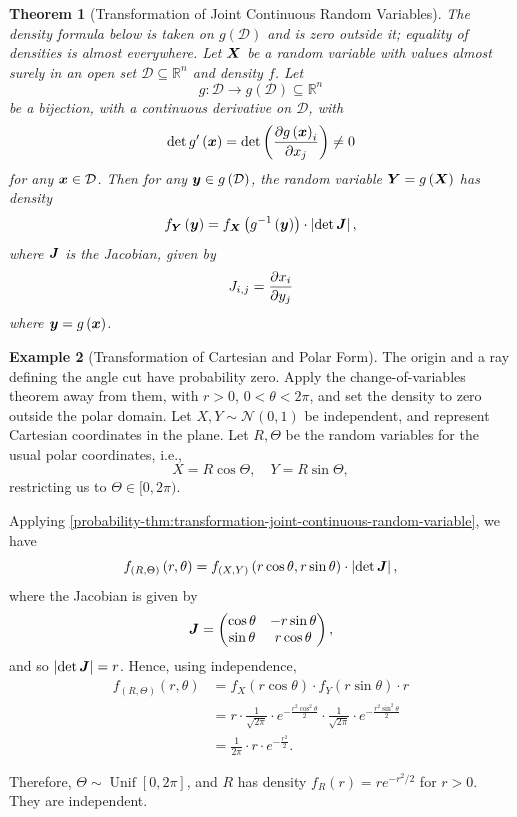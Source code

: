 \documentclass[11pt]{article}
\numberwithin{equation}{section}
\newtheorem{theorem}{Theorem}[section]
\theoremstyle{definition}
\newtheorem{example}[theorem]{Example}
\theoremstyle{remark}
\newcommand{\pqty}[1]{\left(#1\right)}
\newcommand{\abs}[1]{\left|#1\right|}
\newcommand{\ccintv}[2]{[#1,#2]}
\newcommand{\cointv}[2]{[#1,#2)}
\newcommand{\functiondomain}[3]{#1:#2\to #3}
\newcommand{\RR}{\mathbb R}
\newcommand{\inverse}{^{-1}}
\newcommand{\Uniform}{\operatorname{Unif}}
\newcommand{\Normal}{\mathcal N}
\newcommand{\pmqty}[1]{\begin{pmatrix}#1\end{pmatrix}}
\begin{document}
\begin{theorem}[Transformation of Joint Continuous Random Variables]\label{probability-theorem-021}
    \label{probability-thm:transformation-joint-continuous-random-variable}
The density formula below is taken on \(g(\mathcal D)\) and is zero outside it; equality of densities is almost everywhere.
%
    Let \(\vb{X}\) be a random variable with values almost surely in an open set \(\mathcal{D} \subseteq \RR^n\) and density \(f\). Let
    \[
        \functiondomain{g}{\mathcal{D}}{g\pqty{\mathcal{D}} \subseteq \RR^n}
    \]
    be a bijection, with a continuous derivative on \(\mathcal{D}\), with
    \[
        \det g'\pqty{\vb{x}} = \det \pqty{\pdv{g\pqty{\vb{x}}_i}{x_j}} \neq 0
    \]
    for any \(\vb{x} \in \mathcal{D}\). Then for any \(\vb{y} \in g\pqty{\mathcal{D}}\), the random variable \(\vb{Y} = g\pqty{\vb{X}}\) has density
    \[
        f_{\vb{Y}}\pqty{\vb{y}} = f_{\vb{X}} \pqty{g\inverse\pqty{\vb{y}}} \cdot \abs{\det \vb{J}},
    \]
    where \(\vb{J}\) is the \emph{Jacobian}, given by
    \[
        J_{i, j} = \pdv{x_i}{y_j}
    \]
    where \(\vb{y} = g\pqty{\vb{x}}\).
\end{theorem}

\begin{example}[Transformation of Cartesian and Polar Form]\label{probability-example-037}
    \label{probability-ex:transformation-cartesian-polar}%
The origin and a ray defining the angle cut have probability zero. Apply the change-of-variables theorem away from them, with \(r>0\), \(0<\theta<2\pi\), and set the density to zero outside the polar domain.
    Let \(X, Y \sim \Normal\pqty{0, 1}\) be independent, and represent Cartesian coordinates in the plane. Let \(R, \Theta\) be the random variables for the usual polar coordinates, i.e.,
    \[
        X = R \cos \Theta, \quad Y = R \sin \Theta,
    \]
    restricting us to \(\Theta \in \cointv{0}{2\pi}\).

    Applying \autoref{probability-thm:transformation-joint-continuous-random-variable}, we have
    \[
        f_{\pqty{R, \Theta}} \pqty{r, \theta} = f_{\pqty{X, Y}} \pqty{r \cos \theta, r \sin \theta} \cdot \abs{\det \vb{J}},
    \]
    where the Jacobian is given by
    \[
        \vb{J} = \pmqty{
            \cos \theta & - r \sin \theta \\
            \sin \theta & r \cos \theta
        },
    \]
    and so \(\abs{\det \vb{J}} = r\). Hence, using independence,
    \begin{align*}
        f_{\pqty{R, \Theta}} \pqty{r, \theta} &= f_X \pqty{r \cos \theta} \cdot f_Y \pqty{r \sin \theta} \cdot r \\
        &= r \cdot \frac{1}{\sqrt{2\pi}} \cdot e^{- \frac{r^2 \cos^2 \theta}{2}} \cdot \frac{1}{\sqrt{2 \pi}} \cdot e^{- \frac{r^2 \sin^2 \theta}{2}} \\
        &= \frac{1}{2\pi} \cdot r \cdot e^{- \frac{r^2}{2}}.
    \end{align*}

    Therefore, \(\Theta \sim \Uniform\ccintv{0}{2\pi}\), and \(R\) has density \(f_R(r)=r e^{-r^2/2}\) for \(r > 0\). They are independent.
\end{example}
\end{document}
